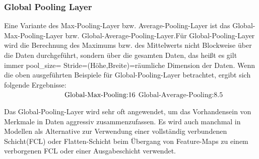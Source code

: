 \documentclass[12pt,a4paper]{scrartcl}
\numberwithin{equation}{section}
\begin{document}
\subsubsection{Global Pooling Layer}
Eine Variante  des Max-Pooling-Layer bzw. Average-Pooling-Layer ist das Global-Max-Pooling-Layer bzw. Global-Average-Pooling-Layer.Für Global-Pooling-Layer wird die Berechnung des Maximums bzw. des Mittelwerts  nicht Blockweise über die Daten durchgeführt, sondern über die gesamten Daten, das heißt es gilt immer pool\_size= Stride=(Höhe,Breite)=räumliche Dimension der Daten. Wenn die oben ausgeführten Beispiele für Global-Pooling-Layer betrachtet, ergibt sich folgende Ergebnisse:\\$ \hspace*{3cm}\text{Global-Max-Pooling:} 16 $ \hspace*{2cm} $ \text{Global-Average-Pooling:}8.5 $

Das Global-Pooling-Layer wird sehr oft angewendet, um das Vorhandensein von Merkmale in Daten aggressiv zusammenzufassen. Es wird auch manchmal in Modellen als Alternative zur Verwendung einer vollständig verbundenen Schicht(\ac{FCL}) oder Flatten-Schicht beim Übergang von Feature-Maps zu einem verborgenen FCL oder einer Ausgabeschicht verwendet.
\end{document}
